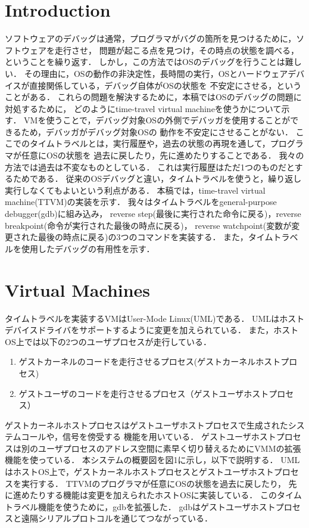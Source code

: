 \documentclass[12pt]{jsarticle}
\begin{document}
\section{Introduction}
ソフトウェアのデバッグは通常，プログラマがバグの箇所を見つけるために，ソフトウェアを走行させ，
問題が起こる点を見つけ，その時点の状態を調べる，ということを繰り返す．
しかし，この方法ではOSのデバッグを行うことは難しい．
その理由に，OSの動作の非決定性，長時間の実行，OSとハードウェアデバイスが直接関係している，デバッグ自体がOSの状態を
不安定にさせる，ということがある．
これらの問題を解決するために，本稿ではOSのデバッグの問題に対処するために，
どのようにtime-travel virtual machineを使うかについて示す．
VMを使うことで，デバッグ対象OSの外側でデバッガを使用することができるため，デバッガがデバッグ対象OSの
動作を不安定にさせることがない．
ここでのタイムトラベルとは，実行履歴や，過去の状態の再現を通して，プログラマが任意にOSの状態を
過去に戻したり，先に進めたりすることである．
我々の方法では過去は不変なものとしている．
これは実行履歴はただ1つのものだとするためである．
従来のOSデバッグと違い，タイムトラベルを使うと，繰り返し実行しなくてもよいという利点がある．
本稿では，time-travel virtual machine(TTVM)の実装を示す．
我々はタイムトラベルをgeneral-purpose debugger(gdb)に組み込み，
reverse step(最後に実行された命令に戻る)，reverse breakpoint(命令が実行された最後の時点に戻る)，
reverse watchpoint(変数が変更された最後の時点に戻る)の3つのコマンドを実装する．
また，タイムトラベルを使用したデバッグの有用性を示す．

\section{Virtual Machines}
タイムトラベルを実装するVMはUser-Mode Linux(UML)である．
UMLはホストデバイスドライバをサポートするように変更を加えられている．
また，ホストOS上では以下の2つのユーザプロセスが走行している．
\begin{enumerate}
\item ゲストカーネルのコードを走行させるプロセス(ゲストカーネルホストプロセス)
\item ゲストユーザのコードを走行させるプロセス（ゲストユーザホストプロセス）
\end{enumerate}
ゲストカーネルホストプロセスはゲストユーザホストプロセスで生成されたシステムコールや，信号を傍受する
機能を用いている．
ゲストユーザホストプロセスは別のユーザプロセスのアドレス空間に素早く切り替えるためにVMMの拡張機能を使っている．
本システムの概要図を図1に示し，以下で説明する．
UMLはホストOS上で，ゲストカーネルホストプロセスとゲストユーザホストプロセスを実行する．
TTVMのプログラマが任意にOSの状態を過去に戻したり，
先に進めたりする機能は変更を加えられたホストOSに実装している．
このタイムトラベル機能を使うために，gdbを拡張した．
gdbはゲストユーザホストプロセスと遠隔シリアルプロトコルを通じてつながっている．
\end{document}
